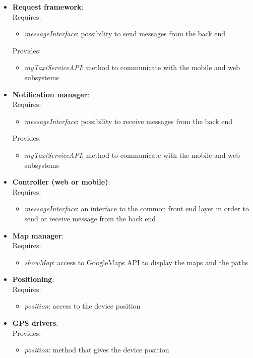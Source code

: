 \begin{itemize}
\item \textbf{Request framework}:\\
Requires:
\begin{itemize}
\item \textit{messageInterface}: possibility to send messages from the back end
\end{itemize} 
Provides:
\begin{itemize}
\item \textit{myTaxiServiceAPI}: method to communicate with the mobile and web subsystems
\end{itemize}

\item \textbf{Notification manager}:\\
Requires:
\begin{itemize}
\item \textit{messageInterface}: possibility to receive messages from the back end
\end{itemize} 
Provides:
\begin{itemize}
\item \textit{myTaxiServiceAPI}: method to communicate with the mobile and web subsystems
\end{itemize}

\item \textbf{Controller (web or mobile)}:\\
Requires:
\begin{itemize}
\item \textit{messageInterface}: an interface to the common front end layer in order to send or receive message from the back end
\end{itemize}

\item \textbf{Map manager}:\\
Requires:
\begin{itemize}
\item \textit{showMap}: access to GoogleMaps API to display the maps and the paths
\end{itemize}

\item \textbf{Positioning}:\\
Requires:
\begin{itemize}
\item \textit{position}: access to the device position
\end{itemize}

\item \textbf{GPS drivers}:\\
Provides:
\begin{itemize}
\item \textit{position}: method that gives the device position
\end{itemize}

\end{itemize}

